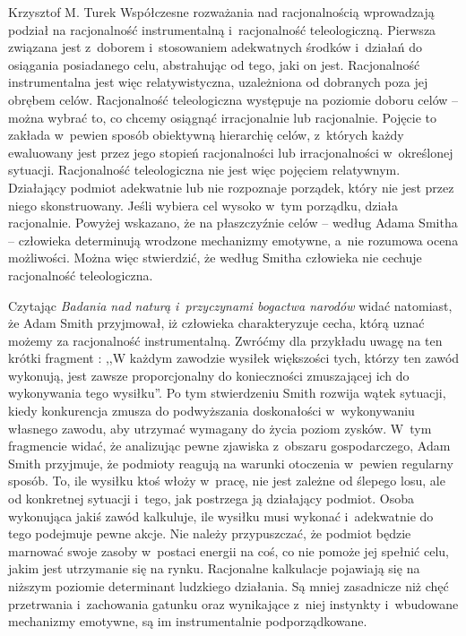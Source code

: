 \begin{artplenv}{Krzysztof M. Turek}
Współczesne rozważania nad racjonalnością
\parencite[s.~12]{bochenek_problem_1999}
wprowadzają podział na
racjonalność instrumentalną i~racjonalność teleologiczną. Pierwsza związana jest z~doborem i~stosowaniem adekwatnych
środków i~działań do osiągania posiadanego celu, abstrahując od tego, jaki on jest. Racjonalność instrumentalna jest
więc relatywistyczna, uzależniona od dobranych poza jej obrębem celów. Racjonalność teleologiczna występuje na poziomie
doboru celów -- można wybrać to, co chcemy osiągnąć irracjonalnie lub racjonalnie. Pojęcie to zakłada w~pewien sposób
obiektywną hierarchię celów, z~których każdy ewaluowany jest przez jego stopień racjonalności lub
irracjonalności w~określonej sytuacji. Racjonalność teleologiczna nie jest więc pojęciem relatywnym.
Działający podmiot adekwatnie lub
nie rozpoznaje porządek, który nie jest przez niego skonstruowany. Jeśli wybiera cel wysoko w~tym porządku, działa
racjonalnie. Powyżej wskazano, że na płaszczyźnie celów -- według Adama Smitha -- człowieka determinują wrodzone
mechanizmy emotywne, a~nie rozumowa ocena możliwości. Można więc stwierdzić, że według Smitha człowieka nie cechuje
racjonalność teleologiczna.

Czytając \textit{Badania nad naturą i~przyczynami bogactwa narodów} widać natomiast, że Adam Smith przyjmował,
iż człowieka charakteryzuje cecha, którą uznać możemy za racjonalność instrumentalną. Zwróćmy dla przykładu uwagę na
ten krótki fragment
\parencite[s.~423]{smith_badania_2007}:
,,W każdym zawodzie wysiłek większości tych, którzy
ten zawód wykonują, jest zawsze proporcjonalny do konieczności zmuszającej ich do wykonywania tego wysiłku''. Po tym
stwierdzeniu Smith rozwija wątek sytuacji, kiedy konkurencja zmusza do podwyższania doskonałości w~wykonywaniu własnego
zawodu, aby utrzymać wymagany do życia poziom zysków. W~tym fragmencie widać, że analizując pewne zjawiska z~obszaru
gospodarczego, Adam Smith przyjmuje, że podmioty reagują na warunki otoczenia w~pewien regularny sposób. To, ile
wysiłku ktoś włoży w~pracę, nie jest zależne od ślepego losu, ale od konkretnej sytuacji i~tego, jak postrzega ją
działający podmiot. Osoba wykonująca jakiś zawód kalkuluje, ile wysiłku musi wykonać i~adekwatnie do tego podejmuje
pewne akcje. Nie należy przypuszczać, że podmiot będzie marnować swoje zasoby w~postaci energii na coś, co nie pomoże
jej spełnić celu, jakim jest utrzymanie się na rynku. Racjonalne kalkulacje pojawiają się na niższym poziomie
determinant ludzkiego działania. Są mniej zasadnicze niż chęć przetrwania i~zachowania gatunku oraz wynikające z~niej
instynkty i~wbudowane mechanizmy emotywne, są im instrumentalnie podporządkowane.


\end{artplenv}
